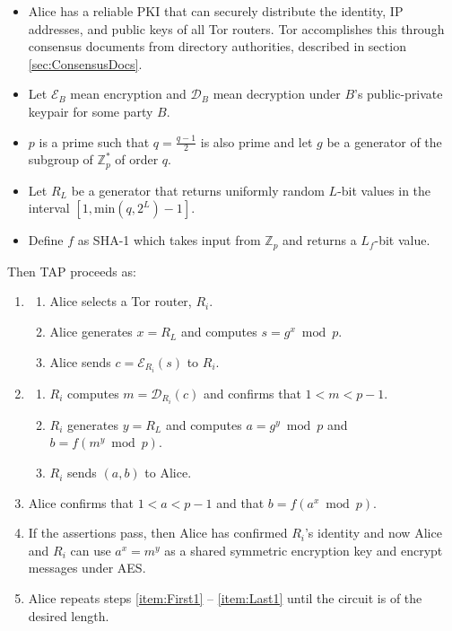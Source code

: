 \begin{itemize}
	\item Alice has a reliable PKI that can securely distribute the identity, IP addresses, and public keys of all Tor routers. Tor accomplishes this through consensus documents from directory authorities, described in section \ref{sec:ConsensusDocs}.
	\item Let $ \mathcal{E}_{B} $ mean encryption and $ \mathcal{D}_{B} $ mean decryption under $ B $'s public-private keypair for some party $ B $.
	\item $ p $ is a prime such that $ q = \frac{q - 1}{2} $ is also prime and let $ g $ be a generator of the subgroup of $ \mathbb{Z}^{*}_{p} $ of order $ q $.
	\item Let $ R_{L} $ be a generator that returns uniformly random $ L $-bit values in the interval $ [1, \textrm{min}(q, 2 ^ L) - 1] $.
	\item Define $ f $ as SHA-1 which takes input from $ \mathbb{Z}_{p} $ and returns a $ L_{f} $-bit value.
\end{itemize}

Then TAP proceeds as:

\begin{enumerate}
	\item \label{item:First1}
		\begin{enumerate}
			\item Alice selects a Tor router, $ R_{i} $.
			\item Alice generates $ x = R_{L} $ and computes $ s = g ^ x \bmod{p} $.
			\item Alice sends $ c = \mathcal{E}_{R_{i}}(s) $ to $ R_{i} $.
		\end{enumerate}
	\item
		\begin{enumerate}
			\item $ R_{i} $ computes $ m = \mathcal{D}_{R_{i}}(c) $ and confirms that $ 1 < m < p - 1 $.
			\item $ R_{i} $ generates $ y = R_{L} $ and computes $ a = g ^ y \bmod{p} $ and $ b = f(m ^ y \bmod{p}) $.
			\item $ R_{i} $ sends $ (a, b) $ to Alice.
		\end{enumerate}
	\item
		Alice confirms that $ 1 < a < p - 1 $ and that $ b = f(a ^ x \bmod{p}) $.
	\item \label{item:Last1}
		If the assertions pass, then Alice has confirmed $ R_{i} $'s identity and now Alice and $ R_{i} $ can use $ a ^ x = m ^ y $ as a shared symmetric encryption key and encrypt messages under AES.
	\item 
		Alice repeats steps \ref{item:First1} -- \ref{item:Last1} until the circuit is of the desired length.
\end{enumerate}

